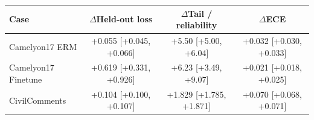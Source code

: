 \begin{tabular}{lccc}
  \toprule
  Case & $\Delta$Held-out loss & $\Delta$Tail / reliability & $\Delta$ECE \\
  \midrule
  Camelyon17 ERM & +0.055 [+0.045, +0.066] & +5.50 [+5.00, +6.04] & +0.032 [+0.030, +0.033] \\
  Camelyon17 Finetune & +0.619 [+0.331, +0.926] & +6.23 [+3.49, +9.07] & +0.021 [+0.018, +0.025] \\
  CivilComments & +0.104 [+0.100, +0.107] & +1.829 [+1.785, +1.871] & +0.070 [+0.068, +0.071] \\
  \bottomrule
\end{tabular}
